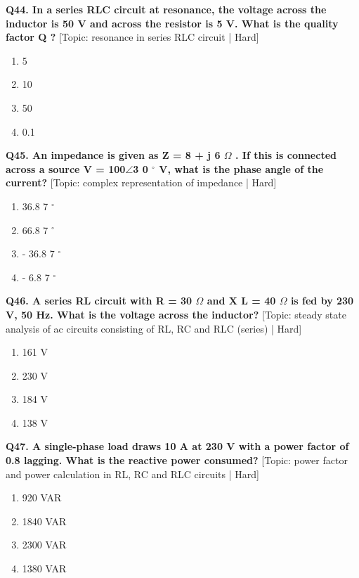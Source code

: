 \noindent\textbf{Q44. In a series RLC circuit at resonance, the voltage across the inductor is 50 V and across the resistor is 5 V. What is the quality factor Q ?} \hfill [Topic: resonance in series RLC circuit | Hard]
\begin{enumerate}[label=(\alph*),topsep=2pt,itemsep=1pt,partopsep=0pt,parsep=0pt]
    \item {5}
    \item {10}
    \item {50}
    \item {0.1}
\end{enumerate}
\vspace{2mm}

\noindent\textbf{Q45. An impedance is given as Z = 8 + j 6 $\Omega$ . If this is connected across a source V = 100$\angle$3 0 $^\circ$ V, what is the phase angle of the current?} \hfill [Topic: complex representation of impedance | Hard]
\begin{enumerate}[label=(\alph*),topsep=2pt,itemsep=1pt,partopsep=0pt,parsep=0pt]
    \item {36.8 7 $^\circ$}
    \item {66.8 7 $^\circ$}
    \item {- 36.8 7 $^\circ$}
    \item {- 6.8 7 $^\circ$}
\end{enumerate}
\vspace{2mm}

\noindent\textbf{Q46. A series RL circuit with R = 30 $\Omega$ and X L = 40 $\Omega$ is fed by 230 V, 50 Hz. What is the voltage across the inductor?} \hfill [Topic: steady state analysis of ac circuits consisting of RL, RC and RLC (series) | Hard]
\begin{enumerate}[label=(\alph*),topsep=2pt,itemsep=1pt,partopsep=0pt,parsep=0pt]
    \item {161 V}
    \item {230 V}
    \item {184 V}
    \item {138 V}
\end{enumerate}
\vspace{2mm}

\noindent\textbf{Q47. A single-phase load draws 10 A at 230 V with a power factor of 0.8 lagging. What is the reactive power consumed?} \hfill [Topic: power factor and power calculation in RL, RC and RLC circuits | Hard]
\begin{enumerate}[label=(\alph*),topsep=2pt,itemsep=1pt,partopsep=0pt,parsep=0pt]
    \item {920 VAR}
    \item {1840 VAR}
    \item {2300 VAR}
    \item {1380 VAR}
\end{enumerate}
\vspace{2mm}


